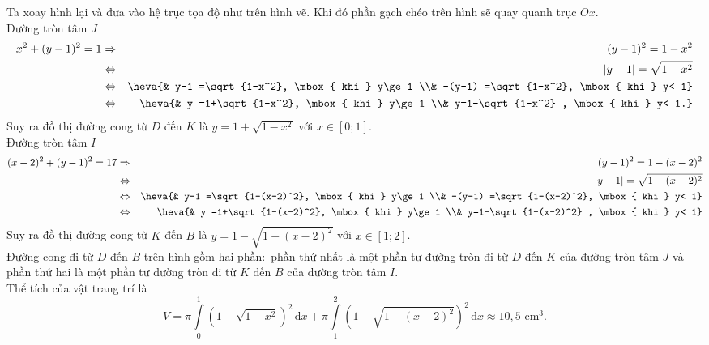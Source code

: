 \begin{bt}
{\begin{center}
		\end{center}
		Ta xoay hình lại và đưa vào hệ trục tọa độ như trên hình vẽ. Khi đó phần gạch chéo trên hình sẽ quay quanh trục $Ox$.\\
		Đường tròn tâm $J$
		\allowdisplaybreaks
		\begin{eqnarray*}
			x^2+(y-1)^2=1&\Rightarrow& (y-1)^2=1-x^2\\
			& \Leftrightarrow& |y-1|=\sqrt{1-x^2}\\
			& \Leftrightarrow &\heva{& y-1 =\sqrt{1-x^2}, \mbox{ khi } y\ge 1 \\& -(y-1) =\sqrt{1-x^2}, \mbox{ khi } y< 1} \\
			&\Leftrightarrow& \heva{& y =1+\sqrt{1-x^2}, \mbox{ khi } y\ge 1 \\& y=1-\sqrt{1-x^2} , \mbox{ khi } y< 1.}
		\end{eqnarray*}	
		Suy ra đồ thị đường cong từ $D$ đến $K$ là $y=1+\sqrt{1-x^2}$ với $x\in [0;1]$.\\	
		Đường tròn tâm $I$
		\begin{eqnarray*}
			(x-2)^2+(y-1)^2=17&\Rightarrow& (y-1)^2=1-(x-2)^2 \\
			&\Leftrightarrow& |y-1|=\sqrt{1-(x-2)^2}\\
			&\Leftrightarrow& \heva{& y-1 =\sqrt{1-(x-2)^2}, \mbox{ khi } y\ge 1 \\& -(y-1) =\sqrt{1-(x-2)^2}, \mbox{ khi } y< 1}\\
			&\Leftrightarrow& \heva{& y =1+\sqrt{1-(x-2)^2}, \mbox{ khi } y\ge 1 \\& y=1-\sqrt{1-(x-2)^2} , \mbox{ khi } y< 1}
		\end{eqnarray*}
		Suy ra đồ thị đường cong từ $K$ đến $B$ là $y=1-\sqrt{1-(x-2)^2}$ với $x\in [1;2]$.\\	
		Đường cong đi từ $D$ đến $B$ trên hình gồm hai phần$\colon$ phần thứ nhất là một phần tư đường tròn đi từ $D$ đến $K$ của đường tròn tâm $J$ và phần thứ hai là một phần tư đường tròn đi từ $K$ đến $B$ của đường tròn tâm $I$.\\
		Thể tích của vật trang trí là
		$$V= \pi\displaystyle\int\limits_0^1 \left(1+\sqrt{1-x^2}\right)^2\mathrm{\,d}x +  \pi\displaystyle\int\limits_1^2 \left(1-\sqrt{1-(x-2)^2}\right)^2\mathrm{\,d}x \approx 10{,}5 \mbox{ cm}^3.$$
	}
\end{bt}

